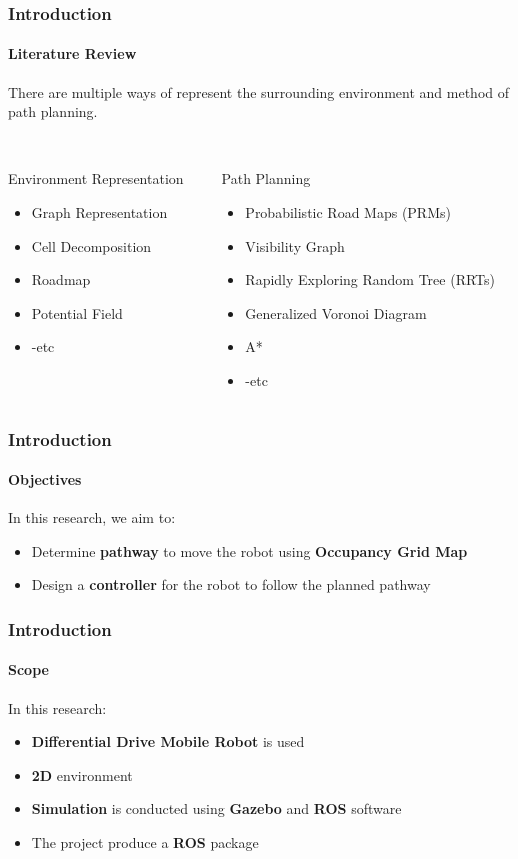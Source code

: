 \begin{frame}
	\frametitle{Introduction}
	\framesubtitle{Literature Review}
	There are multiple ways of represent the surrounding environment and method of path planning.\\
	\hspace{\linewidth}\\
		\begin{columns}[T]
		\begin{column}[T]{.4\textwidth}
		Environment Representation
		\begin{itemize}
			\item Graph Representation
			\item Cell Decomposition
			\item Roadmap
			\item Potential Field
			\item -etc
		\end{itemize}
		\end{column}
		\begin{column}[T]{.6\textwidth}
		Path Planning
		\begin{itemize}
			\item Probabilistic Road Maps (PRMs)
			\item Visibility Graph
			\item Rapidly Exploring Random Tree (RRTs)
			\item Generalized Voronoi Diagram
			\item A*
			\item -etc
		\end{itemize}
	\end{column}
	\end{columns}
\end{frame}


\begin{frame}
	\frametitle{Introduction}
	\framesubtitle{Objectives}
	In this research, we aim to:
	\begin{itemize}
		\item<1-> Determine \textbf{pathway} to move the robot using \textbf{Occupancy Grid Map}
		\item<2-> Design a \textbf{controller} for the robot to follow the planned pathway
	\end{itemize}
\end{frame}



\begin{frame}
	\frametitle{Introduction}
	\framesubtitle{Scope}
	In this research:
	\begin{itemize}
		\item<1-> \textbf{Differential Drive Mobile Robot} is used
		\item<2-> \textbf{2D} environment
		\item<3-> \textbf{Simulation} is conducted using \textbf{Gazebo} and \textbf{ROS} software
		\item<4-> The project produce a \textbf{ROS} package
	\end{itemize}
\end{frame}